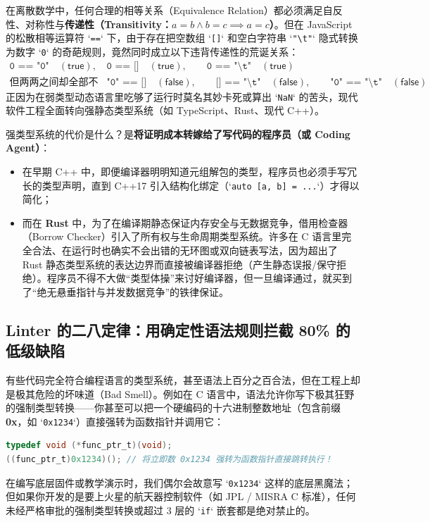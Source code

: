 \documentclass[a4paper]{article}
\begin{document}
在离散数学中，任何合理的相等关系（Equivalence Relation）都必须满足自反性、对称性与\textbf{传递性（Transitivity：$a = b \land b = c \implies a = c$）}。但在 JavaScript 的松散相等运算符 `\texttt{==}` 下，由于存在把空数组 `\texttt{[]}` 和空白字符串 `\texttt{"\textbackslash t"}` 隐式转换为数字 `\texttt{0}` 的奇葩规则，竟然同时成立以下违背传递性的荒诞关系：
\begin{equation}
\begin{aligned}
\texttt{0 == "0"} \quad (\mathsf{true}), \qquad
&\texttt{0 == []} \quad (\mathsf{true}), \qquad
\texttt{0 == "\textbackslash t"} \quad (\mathsf{true}) \\
\text{但两两之间却全部不等：}\quad
&\texttt{"0" == []} \quad (\mathsf{false}), \qquad
\texttt{[] == "\textbackslash t"} \quad (\mathsf{false}), \qquad
\texttt{"0" == "\textbackslash t"} \quad (\mathsf{false})
\end{aligned}
\label{eq:js_non_transitive_equality}
\end{equation}
正因为在弱类型动态语言里吃够了运行时莫名其妙卡死或算出 `\texttt{NaN}` 的苦头，现代软件工程全面转向强静态类型系统（如 TypeScript、Rust、现代 C++）。

强类型系统的代价是什么？是\textbf{将证明成本转嫁给了写代码的程序员（或 Coding Agent）}：
\begin{itemize}
    \item 在早期 C++ 中，即便编译器明明知道元组解包的类型，程序员也必须手写冗长的类型声明，直到 C++17 引入结构化绑定（`\texttt{auto [a, b] = ...}`）才得以简化；
    \item 而在 \textbf{Rust} 中，为了在编译期静态保证内存安全与无数据竞争，借用检查器（Borrow Checker）引入了所有权与生命周期类型系统。许多在 C 语言里完全合法、在运行时也确实不会出错的无环图或双向链表写法，因为超出了 Rust 静态类型系统的表达边界而直接被编译器拒绝（产生静态误报/保守拒绝）。程序员不得不大做“类型体操”来讨好编译器，但一旦编译通过，就买到了“绝无悬垂指针与并发数据竞争”的铁律保证。
\end{itemize}

\subsection{Linter 的二八定律：用确定性语法规则拦截 80\% 的低级缺陷}

有些代码完全符合编程语言的类型系统，甚至语法上百分之百合法，但在工程上却是极其危险的坏味道（Bad Smell）。例如在 C 语言中，语法允许你写下极其狂野的强制类型转换——你甚至可以把一个硬编码的十六进制整数地址（包含前缀 \textbf{0x}，如 `\texttt{0x1234}`）直接强转为函数指针并调用它：
\begin{lstlisting}[language=C, caption={C 语言中语法合法但工程上极度危险的硬编码地址函数指针强转}]
typedef void (*func_ptr_t)(void);
((func_ptr_t)0x1234)(); // 将立即数 0x1234 强转为函数指针直接跳转执行！
\end{lstlisting}
在编写底层固件或教学演示时，我们偶尔会故意写 `\texttt{0x1234}` 这样的底层黑魔法；但如果你开发的是要上火星的航天器控制软件（如 JPL / MISRA C 标准），任何未经严格审批的强制类型转换或超过 3 层的 `\texttt{if}` 嵌套都是绝对禁止的。
\end{document}
